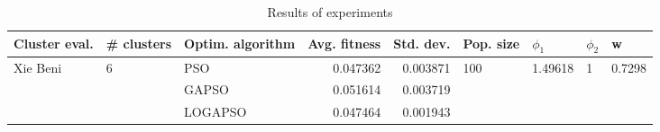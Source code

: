 \begin{table}
\centering
\caption{Results of experiments}
\begin{tabular}{lllrrllll}
\toprule
            Cluster eval. &        \# clusters & Optim. algorithm &  Avg. fitness &  Std. dev. &            Pop. size &               $\phi_{1}$ &         $\phi_{2}$ &                       w \\
\midrule
\multirow{3}{*}{Xie Beni} & \multirow{3}{*}{6} &              PSO &      0.047362 &   0.003871 & \multirow{3}{*}{100} & \multirow{3}{*}{1.49618} & \multirow{3}{*}{1} & \multirow{3}{*}{0.7298} \\
                          &                    &            GAPSO &      0.051614 &   0.003719 &                      &                          &                    &                         \\
                          &                    &          LOGAPSO &      0.047464 &   0.001943 &                      &                          &                    &                         \\
\bottomrule
\end{tabular}
\end{table}
